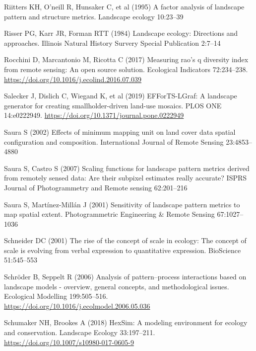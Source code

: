 \documentclass[
  10pt,
  a4paperpaper,
]{article}
\newlength{\cslhangindent}
\newenvironment{CSLReferences}[2] %
 {\begin{list}{}{%
  \setlength{\itemindent}{0pt}
  \setlength{\leftmargin}{0pt}
  \setlength{\parsep}{0pt}
  \ifodd #1
   \setlength{\leftmargin}{\cslhangindent}
   \setlength{\itemindent}{-1\cslhangindent}
  \fi
  \setlength{\itemsep}{#2\baselineskip}}}
 {\end{list}}
\begin{document}
\begin{CSLReferences}{1}{1}
Riitters KH, O'neill R, Hunsaker C, et al (1995) A factor analysis of
landscape pattern and structure metrics. Landscape ecology 10:23--39

Risser PG, Karr JR, Forman RTT (1984) Landscape ecology: Directions and
approaches. Illinois Natural History Survery Special Publication 2:7--14

Rocchini D, Marcantonio M, Ricotta C (2017) Measuring rao's q diversity
index from remote sensing: An open source solution. Ecological
Indicators 72:234--238.
\url{https://doi.org/10.1016/j.ecolind.2016.07.039}

Salecker J, Dislich C, Wiegand K, et al (2019) EFForTS-LGraf: A
landscape generator for creating smallholder-driven land-use mosaics.
PLOS ONE 14:e0222949. \url{https://doi.org/10.1371/journal.pone.0222949}

Saura S (2002) Effects of minimum mapping unit on land cover data
spatial configuration and composition. International Journal of Remote
Sensing 23:4853--4880

Saura S, Castro S (2007) Scaling functions for landscape pattern metrics
derived from remotely sensed data: Are their subpixel estimates really
accurate? ISPRS Journal of Photogrammetry and Remote sensing 62:201--216

Saura S, Martínez-Millán J (2001) Sensitivity of landscape pattern
metrics to map spatial extent. Photogrammetric Engineering \& Remote
Sensing 67:1027--1036

Schneider DC (2001) The rise of the concept of scale in ecology: The
concept of scale is evolving from verbal expression to quantitative
expression. BioScience 51:545--553

Schröder B, Seppelt R (2006) Analysis of pattern--process interactions
based on landscape models - overview, general concepts, and
methodological issues. Ecological Modelling 199:505--516.
\url{https://doi.org/10.1016/j.ecolmodel.2006.05.036}

Schumaker NH, Brookes A (2018) HexSim: A modeling environment for
ecology and conservation. Landscape Ecology 33:197--211.
\url{https://doi.org/10.1007/s10980-017-0605-9}


\end{CSLReferences}
\end{document}
